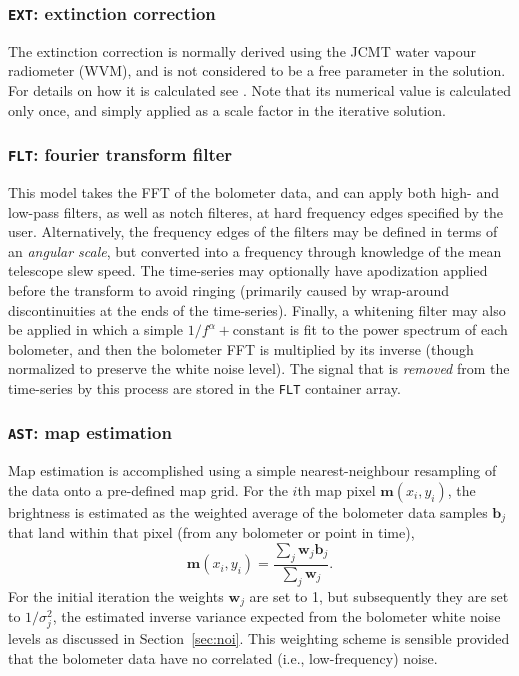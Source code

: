 \documentclass[useAMS,usenatbib,nofootinbib]{mn2e}
\begin{document}
\subsubsection{\texttt{EXT}: extinction correction}
\label{sec:ext}

The extinction correction is normally derived using the JCMT water
vapour radiometer (WVM), and is not considered to be a free parameter
in the solution. For details on how it is calculated see
\citet{dempsey2011}. Note that its numerical value is calculated only
once, and simply applied as a scale factor in the iterative solution.


\subsubsection{\texttt{FLT}: fourier transform filter}
\label{sec:flt}

This model takes the FFT of the bolometer data, and can apply both
high- and low-pass filters, as well as notch filteres, at hard
frequency edges specified by the user. Alternatively, the frequency
edges of the filters may be defined in terms of an \emph{angular
  scale}, but converted into a frequency through knowledge of the mean
telescope slew speed. The time-series may optionally have apodization
applied before the transform to avoid ringing (primarily caused by
wrap-around discontinuities at the ends of the time-series). Finally,
a whitening filter may also be applied in which a simple $1/f^\alpha +
\mathrm{constant}$ is fit to the power spectrum of each bolometer, and
then the bolometer FFT is multiplied by its inverse (though normalized
to preserve the white noise level).  The signal that is \emph{removed}
from the time-series by this process are stored in the \texttt{FLT}
container array.

\subsubsection{\texttt{AST}: map estimation}
\label{sec:ast}

Map estimation is accomplished using a simple nearest-neighbour
resampling of the data onto a pre-defined map grid. For the $i$th map
pixel $\mathbf{m}(x_i,y_i)$, the brightness is estimated as the
weighted average of the bolometer data samples $\mathbf{b}_j$ that
land within that pixel (from any bolometer or point in time),
%
\begin{equation}
  \mathbf{m}(x_i,y_i) = \frac{\sum_j \mathbf{w}_j \mathbf{b}_j }
                             { \sum_j \mathbf{w}_j } .
\end{equation}
%
For the initial iteration the weights $\mathbf{w}_j$ are set to 1, but
subsequently they are set to $1/\sigma_j^2$, the estimated inverse
variance expected from the bolometer white noise levels as discussed
in Section~\ref{sec:noi}. This weighting scheme is sensible provided
that the bolometer data have no correlated (i.e., low-frequency)
noise.
\end{document}
